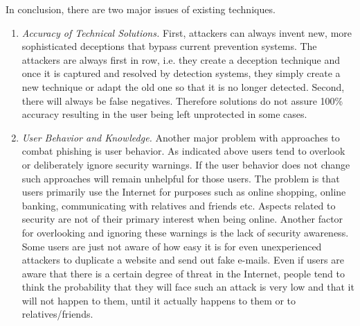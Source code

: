 In conclusion, there are two major issues of existing techniques.
\begin{enumerate}
	\item\textit{Accuracy of Technical Solutions.} First, attackers can always invent new, more sophisticated deceptions that bypass current prevention systems.
	 The attackers are always first in row, i.e. they create a deception technique and once it is captured and resolved by detection systems, they simply create a new technique or adapt the old one so that it is no longer detected.
	 Second, there will always be false negatives.
	 Therefore solutions do not assure 100\% accuracy resulting in the user being left unprotected in some cases.
	\item\textit{User Behavior and Knowledge.} Another major problem with approaches to combat phishing is user behavior.
 As indicated above users tend to overlook or deliberately ignore security warnings.
 If the user behavior does not change such approaches will remain unhelpful for those users.
 The problem is that users primarily use the Internet for purposes such as online shopping, online banking, communicating with relatives and friends etc.
 Aspects related to security are not of their primary interest when being online.
 Another factor for overlooking and ignoring these warnings is the lack of security awareness.
 Some users are just not aware of how easy it is for even unexperienced attackers to duplicate a website and send out fake e-mails.
 Even if users are aware that there is a certain degree of threat in the Internet, people tend to think the probability that they will face such an attack is very low and that it will not happen to them, until it actually happens to them or to relatives/friends.
\end{enumerate}


